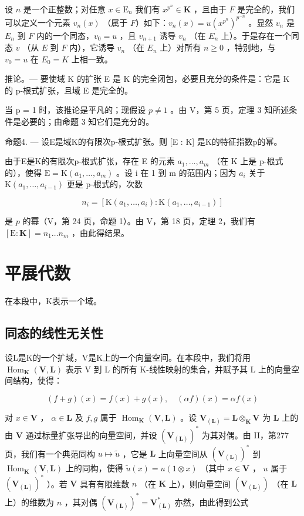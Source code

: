 设 \(n\) 是一个正整数；对任意 \(x \in \mathrm{E}_n\) 我们有 \(x^{p^n} \in \mathbf{K}\) ，且由于 \(F\) 是完全的，我们可以定义一个元素 \(v_n(x)\) （属于 \(F\)）如下：\(v_n(x) = u(x^{p^n})^{p^{-n}}\) 。显然 \(v_n\) 是 \(E_n\) 到 \(F\) 内的一个同态，\(v_0 = u\) ，且 \(v_{n+1}\) 诱导 \(v_n\) （在 \(E_n\) 上）。于是存在一个同态 \(v\) （从 \(E\) 到 \(F\) 内），它诱导 \(v_n\) （在 \(E_n\) 上）对所有 \(n \geqslant 0\) ，特别地，与 \(v_0 = u\) 在 \(E_0 = K\) 上相一致。

推论。--- 要使域 K 的扩张 E 是 K 的完全闭包，必要且充分的条件是：它是 K 的 p-根式扩张，且域 E 是完全的。

当 p = 1 时，该推论是平凡的；现假设 \(p \neq 1\) 。由 V，第 5 页，定理 3 知所述条件是必要的；由命题 3 知它们是充分的。

命题4. --- 设E是域K的有限次p-根式扩张。则 {[}E : K{]} 是K的特征指数p的幂。

由于E是K的有限次p-根式扩张，存在 E 的元素 \(a_{1}, \ldots, a_{m}\) （在 K 上是 p-根式的），使得 \(\mathrm{E} = \mathrm{K}(a_{1}, \ldots, a_{m})\) 。设 i 在 1 到 m 的范围内；因为 \(a_{i}\) 关于 \(\mathrm{K}(a_{1}, \ldots, a_{i-1})\) 更是 p-根式的，次数

\[
n _ {i} = \left[ \mathrm{K} (a _ {1}, \dots , a _ {i}): \mathrm{K} (a _ {1}, \dots , a _ {i - 1}) \right]
\]

是 \(p\) 的幂（V，第 24 页，命题 1）。由 V，第 18 页，定理 2，我们有 \([\mathrm{E}:\mathbf{K}] = n_1\ldots n_m\) ，由此得结果。

\section{平展代数}

在本段中，K表示一个域。

\subsection{同态的线性无关性}

设L是K的一个扩域，V是K上的一个向量空间。在本段中，我们将用 \(\operatorname{Hom}_{\mathbf{K}}(\mathbf{V},\mathbf{L})\) 表示 V 到 L 的所有 K-线性映射的集合，并赋予其 L 上的向量空间结构，使得：

\[
(f + g) (x) = f (x) + g (x), \quad (\alpha f) (x) = \alpha f (x)\tag{1}
\]

对 \(x \in \mathbf{V}\) ， \(\alpha \in \mathbf{L}\) 及 \(f, g\) 属于 \(\operatorname{Hom}_{\mathbf{K}}(\mathbf{V}, \mathbf{L})\) 。设 \(\mathbf{V}_{(\mathbf{L})} = \mathbf{L} \otimes_{\mathbf{K}} \mathbf{V}\) 为 \(\mathbf{L}\) 上的由 \(\mathbf{V}\) 通过标量扩张导出的向量空间，并设 \((\mathbf{V}_{(\mathbf{L})})^*\) 为其对偶。由 II，第277页，我们有一个典范同构 \(u \mapsto \tilde{u}\) ，它是 \(\mathbf{L}\) 上向量空间从 \((\mathbf{V}_{(\mathbf{L})})^*\) 到 \(\operatorname{Hom}_{\mathbf{K}}(\mathbf{V}, \mathbf{L})\) 上的同构，使得 \(\tilde{u}(x) = u(1 \otimes x)\) （其中 \(x \in \mathbf{V}\) ， \(u\) 属于 \((\mathbf{V}_{(\mathbf{L})})^*\) ）。若 \(\mathbf{V}\) 具有有限维数 \(n\) （在 \(\mathbf{K}\) 上），则向量空间 \((\mathbf{V}_{(\mathbf{L})})\) （在 \(\mathbf{L}\) 上）的维数为 \(n\) ，其对偶 \((\mathbf{V}_{(\mathbf{L})})^* = \mathbf{V}_{(\mathbf{L})}^*\) 亦然，由此得到公式

